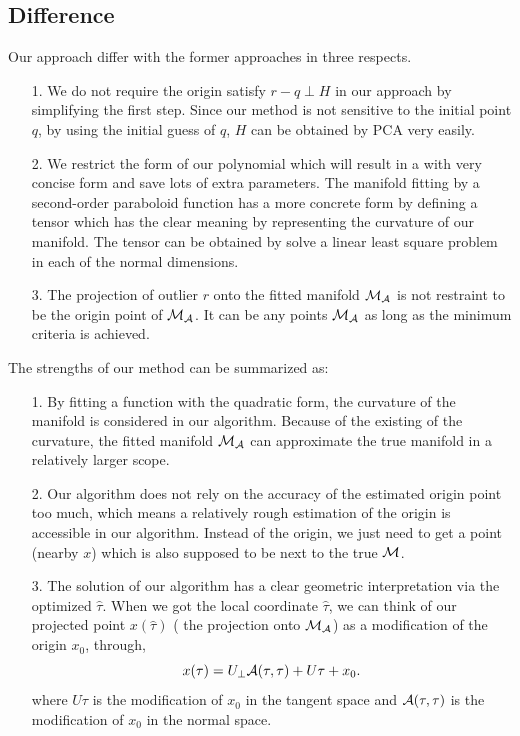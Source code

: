 \documentclass[aos,preprint]{imsart}
\theoremstyle{remark}
\begin{document}
\subsection{Difference}
Our approach differ with the former approaches in three respects. 
\begin{itemize}
\item[1.] We do not require the origin satisfy $r-q\perp H$ in our approach by simplifying the first step. 
Since our method is not sensitive to the initial point $q$, by using the initial guess of $q$, $H$ can be obtained by PCA very easily.
\item[2.] We restrict the form of our polynomial which will result in a with very concise form and save lots of extra parameters. The manifold fitting by a second-order paraboloid function has a more concrete form by defining a tensor which has the clear meaning by representing the curvature of our manifold. The tensor can be obtained by solve a linear least square problem in each of the normal dimensions.
\item[3.] The projection of outlier $r$ onto the fitted manifold $\cal M_A$ is not restraint to be the origin point of ${\cal M_A}$. It can be any points $\cal M_A$ as long as the minimum criteria is achieved.
\end{itemize}
The strengths of our method can be summarized as:
\begin{itemize}
\item[1.] By fitting a function with the quadratic form, the curvature of the manifold is considered in our algorithm. Because of the existing of the curvature, the fitted manifold ${\cal M}_{\cal A}$ can approximate the true manifold in a relatively larger scope.
\item[2.] Our algorithm does not rely on the accuracy of the estimated origin point too much, which means a relatively rough estimation of the origin is accessible in our algorithm. Instead of the origin, we just need to get a point (nearby $x$) which is also supposed to be next to the true $\cal M$.
\item[3.] The solution of our algorithm has a clear geometric interpretation via the optimized $\hat{\tau}$.  When we got the local coordinate $\hat{\tau}$, we can think of our projected point $x(\hat{\tau})$ ( the projection onto ${\cal M}_{\cal A}$) as a modification of the origin $x_0$, through,
\[
x(\tau) = U_\perp {\cal A}(\tau,\tau) + U\tau + x_0. 
\]
where $U\tau$ is the modification of $x_0$ in the tangent space and ${\cal A}(\tau,\tau)$ is the modification of $x_0$ in the normal space.
\end{itemize}
\end{document}
